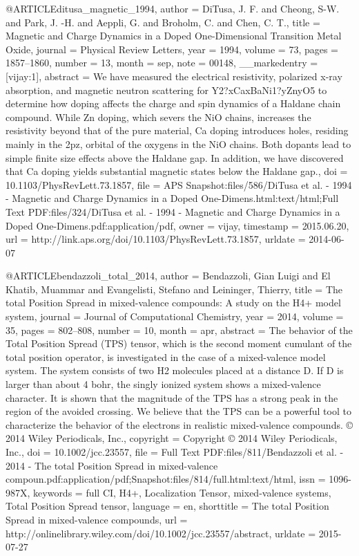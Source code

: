 @ARTICLE{ditusa_magnetic_1994,
  author = {DiTusa, J. F. and Cheong, S-W. and Park, J. -H. and Aeppli, G. and
	Broholm, C. and Chen, C. T.},
  title = {Magnetic and {Charge} {Dynamics} in a {Doped} {One}-{Dimensional}
	{Transition} {Metal} {Oxide}},
  journal = {Physical Review Letters},
  year = {1994},
  volume = {73},
  pages = {1857--1860},
  number = {13},
  month = sep,
  note = {00148},
  __markedentry = {[vijay:1]},
  abstract = {We have measured the electrical resistivity, polarized x-ray absorption,
	and magnetic neutron scattering for Y2?xCaxBaNi1?yZnyO5 to determine
	how doping affects the charge and spin dynamics of a Haldane chain
	compound. While Zn doping, which severs the NiO chains, increases
	the resistivity beyond that of the pure material, Ca doping introduces
	holes, residing mainly in the 2pz, orbital of the oxygens in the
	NiO chains. Both dopants lead to simple finite size effects above
	the Haldane gap. In addition, we have discovered that Ca doping yields
	substantial magnetic states below the Haldane gap.},
  doi = {10.1103/PhysRevLett.73.1857},
  file = {APS Snapshot:files/586/DiTusa et al. - 1994 - Magnetic and Charge Dynamics in a Doped One-Dimens.html:text/html;Full Text PDF:files/324/DiTusa et al. - 1994 - Magnetic and Charge Dynamics in a Doped One-Dimens.pdf:application/pdf},
  owner = {vijay},
  timestamp = {2015.06.20},
  url = {http://link.aps.org/doi/10.1103/PhysRevLett.73.1857},
  urldate = {2014-06-07}
}

@ARTICLE{bendazzoli_total_2014,
  author = {Bendazzoli, Gian Luigi and El Khatib, Muammar and Evangelisti, Stefano
	and Leininger, Thierry},
  title = {The total {Position} {Spread} in mixed-valence compounds: {A} study
	on the {H}4+ model system},
  journal = {Journal of Computational Chemistry},
  year = {2014},
  volume = {35},
  pages = {802--808},
  number = {10},
  month = apr,
  abstract = {The behavior of the Total Position Spread (TPS) tensor, which is the
	second moment cumulant of the total position operator, is investigated
	in the case of a mixed-valence model system. The system consists
	of two H2 molecules placed at a distance D. If D is larger than about
	4 bohr, the singly ionized system shows a mixed-valence character.
	It is shown that the magnitude of the TPS has a strong peak in the
	region of the avoided crossing. We believe that the TPS can be a
	powerful tool to characterize the behavior of the electrons in realistic
	mixed-valence compounds. © 2014 Wiley Periodicals, Inc.},
  copyright = {Copyright © 2014 Wiley Periodicals, Inc.},
  doi = {10.1002/jcc.23557},
  file = {Full Text PDF:files/811/Bendazzoli et al. - 2014 - The total Position Spread in mixed-valence    compoun.pdf:application/pdf;Snapshot:files/814/full.html:text/html},
  issn = {1096-987X},
  keywords = {full CI, H4+, Localization Tensor, mixed-valence systems, Total Position
	Spread tensor},
  language = {en},
  shorttitle = {The total {Position} {Spread} in mixed-valence compounds},
  url = {http://onlinelibrary.wiley.com/doi/10.1002/jcc.23557/abstract},
  urldate = {2015-07-27}
}

